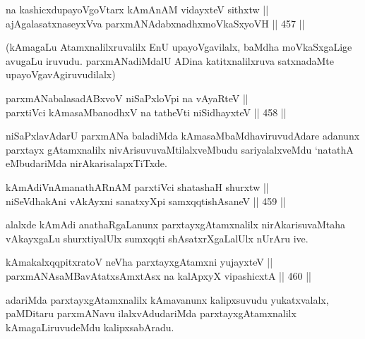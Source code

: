 \begin{shl}
na kashicxdupayoVgoV\s tarx kAmAnAM vidayxteV sithxtw || \\
ajAgalasatxnaseyxVva parxmANAdabxnadhxmoVkaSxyoVH \hfill || 457 ||  
\end{shl}

\begin{artha}
(kAmagaLu Atamxnalilxruvalilx EnU upayoVgavilalx, baMdha moVkaSxgaLige
avugaLu iruvudu. parxmANadiMdalU ADina katitxnalilxruva satxnadaMte upayoVgavAgiruvudilalx)
\end{artha}

\begin{shl}
parxmANabalasadABxvoV niSaPxloV\s pi na vAyaRteV || \\
parxtiVci kAmasaMbanodhxV na tatheVti niSidhayxteV \hfill || 458 ||  
\end{shl}

\begin{artha}
niSaPxlavAdarU parxmANa baladiMda kAmasaMbaMdhaviruvudAdare adanunx
parxtayx gAtamxnalilx nivArisuvuvaMtilalxveMbudu sariyalalxveMdu
`natathA eMbudariMda nirAkarisalapxTiTxde.
\end{artha}


\begin{shl}
kAmAdiVnAmanathARnAM parxtiVci shatashaH shurxtw || \\
niSeVdhakAni vAkAyxni sanatxyXpi samxqqtishAsaneV \hfill || 459 ||  
\end{shl}

\begin{artha}
alalxde kAmAdi anathaRgaLanunx parxtayxgAtamxnalilx nirAkarisuvaMtaha
vAkayxgaLu shurxtiyalUlx sumxqqti shAsatxrXgaLalUlx nUrAru ive.
\end{artha}



\begin{shl}
kAmakalxqqpitxratoV neVha parxtayxgAtamxni yujayxteV || \\
parxmANAsaMBavAtatxsAmxtAsx na kalApxyX vipashicxtA \hfill || 460 ||  
\end{shl}

\begin{artha}
adariMda parxtayxgAtamxnalilx kAmavanunx kalipxsuvudu yukatxvalalx,
paMDitaru parxmANavu ilalxvAdudariMda parxtayxgAtamxnalilx
kAmagaLiruvudeMdu kalipxsabAradu.
\end{artha}


